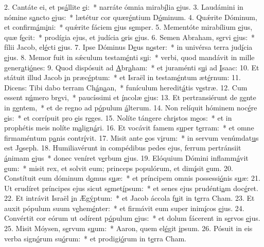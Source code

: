 2. Cantáte ei, et ps\uline{á}llite \uline{e}i:~* narráte ómnia mirab\uline{í}lia \uline{e}jus.
3. Laudámini in nómine s\uline{a}ncto \uline{e}jus:~* lætétur cor quær\uline{é}ntium D\uline{ó}minum.
4. Quǽrite Dóminum, et confirm\uline{á}m\uline{i}ni:~* quǽrite fáciem \uline{e}jus s\uline{e}mper.
5. Mementóte mirabílium \uline{e}jus, quæ f\uline{e}cit:~* prodígia ejus, et judícia \uline{o}ris \uline{e}jus.
6. Semen Abraham, s\uline{e}rvi \uline{e}jus:~* fílii Jacob, el\uline{é}cti \uline{e}jus.
7. Ipse Dóminus D\uline{e}us n\uline{o}ster:~* in univérsa terra jud\uline{í}cia \uline{e}jus.
8. Memor fuit in sǽculum testam\uline{é}nti s\uline{u}i:~* verbi, quod mandávit in mille gener\uline{a}ti\uline{ó}nes:
9. Quod dispósuit ad \uline{A}br\uline{a}ham:~* et juraménti s\uline{u}i ad \uline{I}saac:
10. Et státuit illud Jacob \uline{i}n præc\uline{é}ptum:~* et Israël in testam\uline{é}ntum æt\uline{é}rnum:
11. Dicens: Tibi dabo terram Ch\uline{á}n\uline{a}an,~* funículum heredit\uline{á}tis v\uline{e}stræ.
12. Cum essent n\uline{ú}mero br\uline{e}vi,~* paucíssimi et \uline{í}ncolæ \uline{e}jus:
13. Et pertransiérunt de g\uline{e}nte in g\uline{e}ntem,~* et de regno ad p\uline{ó}pulum \uline{á}lterum.
14. Non relíquit hóminem noc\uline{é}re \uline{e}is:~* et corrípuit pro \uline{e}is r\uline{e}ges.
15. Nolíte tángere chr\uline{i}stos m\uline{e}os:~* et in prophétis meis nolíte m\uline{a}lign\uline{á}ri.
16. Et vocávit famem s\uline{u}per t\uline{e}rram:~* et omne firmaméntum p\uline{a}nis contr\uline{í}vit.
17. Misit ante \uline{e}os v\uline{i}rum:~* in servum venúmdat\uline{u}s est J\uline{o}seph.
18. Humiliavérunt in compédibus pedes ejus, ferrum pertránsiit \uline{á}nimam \uline{e}jus~* donec veníret v\uline{e}rbum \uline{e}jus.
19. Elóquium Dómini inflamm\uline{á}vit \uline{e}um:~* misit rex, et solvit eum; princeps populórum, et dim\uline{í}sit \uline{e}um.
20. Constítuit eum dóminum d\uline{o}mus s\uline{u}æ:~* et príncipem omnis possessi\uline{ó}nis s\uline{u}æ:
21. Ut erudíret príncipes ejus sicut s\uline{e}met\uline{í}psum:~* et senes ejus prudénti\uline{a}m doc\uline{é}ret.
22. Et intrávit Israël \uline{i}n Æg\uline{ý}ptum:~* et Jacob áccola f\uline{u}it in t\uline{e}rra Cham.
23. Et auxit pópulum suum v\uline{e}hem\uline{é}nter:~* et firmávit eum super inim\uline{í}cos \uline{e}jus.
24. Convértit cor eórum ut odírent p\uline{ó}pulum \uline{e}jus:~* et dolum fácerent in s\uline{e}rvos \uline{e}jus.
25. Misit Móysen, s\uline{e}rvum s\uline{u}um:~* Aaron, quem el\uline{é}git \uline{i}psum.
26. Pósuit in eis verba sign\uline{ó}rum su\uline{ó}rum:~* et prodigi\uline{ó}rum in t\uline{e}rra Cham.
